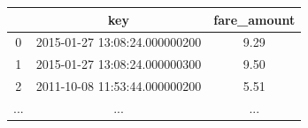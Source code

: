 \documentclass{tikzposter} %
\begin{document}
\begin{columns}
{\begin{description}

\end{description}

\vspace{.5cm}
\centering
\begin{tabular}{ccc}
    \toprule
      & key & fare\_amount \\
  \midrule
      0 & 2015-01-27 13:08:24.000000200 & 9.29 \\
      1 & 2015-01-27 13:08:24.000000300 & 9.50 \\
      2 & 2011-10-08 11:53:44.000000200 & 5.51 \\
      ... & ... &... \\
  \bottomrule
\end{tabular}
}







\end{columns}
\end{document}
